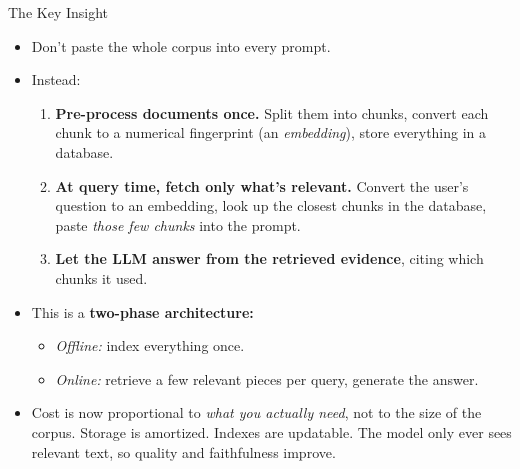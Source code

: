 \begin{frame}{The Key Insight}
\begin{itemize}
\item Don't paste the whole corpus into every prompt.

\medskip
\item Instead:
\begin{enumerate}
    \item \textbf{Pre-process documents once.} Split them into chunks, convert each chunk to a numerical fingerprint (an \emph{embedding}), store everything in a database.
    \item \textbf{At query time, fetch only what's relevant.} Convert the user's question to an embedding, look up the closest chunks in the database, paste \emph{those few chunks} into the prompt.
    \item \textbf{Let the LLM answer from the retrieved evidence}, citing which chunks it used.
\end{enumerate}

\medskip
\item This is a \textbf{two-phase architecture:}
\begin{itemize}
    \item \emph{Offline:} index everything once.
    \item \emph{Online:} retrieve a few relevant pieces per query, generate the answer.
\end{itemize}

\medskip
\item Cost is now proportional to \emph{what you actually need}, not to the size of the corpus. Storage is amortized. Indexes are updatable. The model only ever sees relevant text, so quality and faithfulness improve.
\end{itemize}
\end{frame}

